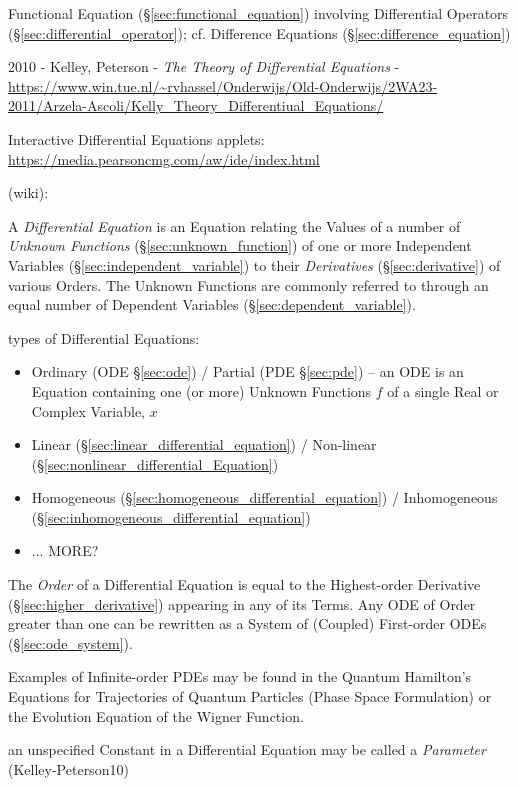 {Functional Equation (\S\ref{sec:functional_equation}) involving Differential
Operators (\S\ref{sec:differential_operator}); cf. Difference Equations
(\S\ref{sec:difference_equation})

2010 - Kelley, Peterson - \emph{The Theory of Differential Equations} -
\url{https://www.win.tue.nl/~rvhassel/Onderwijs/Old-Onderwijs/2WA23-2011/Arzela-Ascoli/Kelly_Theory_Differentiual_Equations/}

Interactive Differential Equations applets:
\url{https://media.pearsoncmg.com/aw/ide/index.html}

(wiki):

A \emph{Differential Equation} is an Equation relating the Values of a number of
\emph{Unknown Functions} (\S\ref{sec:unknown_function}) of one or more
Independent Variables (\S\ref{sec:independent_variable}) to their
\emph{Derivatives} (\S\ref{sec:derivative}) of various Orders. The Unknown
Functions are commonly referred to through an equal number of Dependent
Variables (\S\ref{sec:dependent_variable}).

types of Differential Equations:
\begin{itemize}
  \item Ordinary (ODE \S\ref{sec:ode}) / Partial (PDE \S\ref{sec:pde}) --
    an ODE is an Equation containing one (or more) Unknown Functions $f$ of a
    single Real or Complex Variable, $x$
  \item Linear (\S\ref{sec:linear_differential_equation}) /
    Non-linear (\S\ref{sec:nonlinear_differential_Equation})
  \item Homogeneous (\S\ref{sec:homogeneous_differential_equation}) /
    Inhomogeneous (\S\ref{sec:inhomogeneous_differential_equation})
  \item ... MORE?
\end{itemize}

The \emph{Order} of a Differential Equation is equal to the Highest-order
Derivative (\S\ref{sec:higher_derivative}) appearing in any of its Terms. Any
ODE of Order greater than one can be rewritten as a System of (Coupled)
First-order ODEs (\S\ref{sec:ode_system}).

Examples of Infinite-order PDEs may be found in the Quantum Hamilton's Equations
for Trajectories of Quantum Particles (Phase Space Formulation) or the Evolution
Equation of the Wigner Function.

an unspecified Constant in a Differential Equation may be called a
\emph{Parameter} (Kelley-Peterson10)

}
